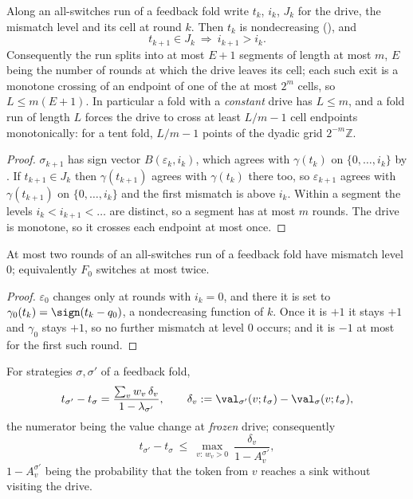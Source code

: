 \begin{corollary}\label{cor:ff-climb}
Along an all-switches run of a feedback fold write $t_k$, $i_k$, $J_k$ for the
drive, the mismatch level and its cell at round $k$. Then $t_k$ is
nondecreasing (), and
\[
  t_{k+1}\in J_k\ \Longrightarrow\ i_{k+1}>i_k .
\]
Consequently the run splits into at most $E+1$ segments of length at most $m$,
$E$ being the number of rounds at which the drive leaves its cell; each such
exit is a monotone crossing of an endpoint of one of the at most $2^{m}$ cells,
so $L\le m(E+1)$. In particular a fold with a \emph{constant} drive has
$L\le m$, and a fold run of length $L$ forces the drive to cross at least
$L/m-1$ cell endpoints monotonically: for a tent fold, $L/m-1$ points of the
dyadic grid $2^{-m}\mathbb Z$.
\end{corollary}

\begin{proof}
$\sigma_{k+1}$ has sign vector $B(\varepsilon_k,i_k)$, which agrees with
$\gamma(t_k)$ on $\{0,\dots,i_k\}$ by . If $t_{k+1}\in J_k$
then $\gamma(t_{k+1})$ agrees with $\gamma(t_k)$ there too, so
$\varepsilon_{k+1}$ agrees with $\gamma(t_{k+1})$ on $\{0,\dots,i_k\}$ and the
first mismatch is above $i_k$. Within a segment the levels
$i_k<i_{k+1}<\dots$ are distinct, so a segment has at most $m$ rounds. The
drive is monotone, so it crosses each endpoint at most once.
\end{proof}

\begin{corollary}\label{cor:ff-level0}
At most two rounds of an all-switches run of a feedback fold have mismatch level
$0$; equivalently $F_0$ switches at most twice.
\end{corollary}

\begin{proof}
$\varepsilon_0$ changes only at rounds with $i_k=0$, and there it is set to
$\gamma_0(t_k)=\sign(t_k-q_0)$, a nondecreasing function of $k$. Once it is
$+1$ it stays $+1$ and $\gamma_0$ stays $+1$, so no further mismatch at level
$0$ occurs; and it is $-1$ at most for the first such round.
\end{proof}

\begin{lemma}\label{lem:ff-response}
For strategies $\sigma,\sigma'$ of a feedback fold,
\[
  t_{\sigma'}-t_\sigma=\frac{\sum_vw_v\,\delta_v}{1-\lambda_{\sigma'}},\qquad
  \delta_v:=\val_{\sigma'}(v;t_\sigma)-\val_\sigma(v;t_\sigma),
\]
the numerator being the value change at \emph{frozen} drive; consequently
\[
  t_{\sigma'}-t_\sigma\ \le\ \max_{v:\,w_v>0}\ \frac{\delta_v}{1-A^{\sigma'}_v},
\]
$1-A^{\sigma'}_v$ being the probability that the token from $v$ reaches a sink
without visiting the drive.
\end{lemma}

